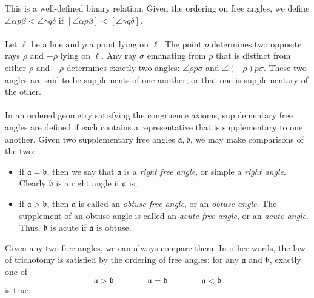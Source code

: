 \documentclass[12pt]{article}
\begin{document}
This is a well-defined binary relation.  Given the ordering on free
angles, we define $\angle \alpha p\beta<\angle \gamma q\delta$ if
$[\angle \alpha p\beta]<[\angle \gamma q\delta]$.
\\\\
Let $\ell$ be a line and $p$ a point lying on $\ell$.  The point $p$
determines two opposite rays $\rho$ and $-\rho$ lying on $\ell$. Any
ray $\sigma$ emanating from $p$ that is distinct from either $\rho$
and $-\rho$ determines exactly two angles: $\angle \rho p\sigma$ and
$\angle (-\rho)p\sigma$.  These two angles are said to be
supplements of one another, or that one is supplementary of the
other.
\\\\
In an ordered geometry satisfying the congruence axioms,
supplementary free angles are defined if each contains a
representative that is supplementary to one another.  Given two
supplementary free angles $\mathfrak{a},\mathfrak{b}$, we may make
comparisons of the two:
\begin{itemize}
\item if $\mathfrak{a}=\mathfrak{b}$, then we say that $\mathfrak{a}$ is a
\emph{right free angle}, or simple a \emph{right angle}.  Clearly
$\mathfrak{b}$ is a right angle if $\mathfrak{a}$ is;
\item if $\mathfrak{a}>\mathfrak{b}$, then $\mathfrak{a}$ is called
an \emph{obtuse free angle}, or an \emph{obtuse angle}.  The
supplement of an obtuse angle is called an \emph{acute free angle},
or an \emph{acute angle}.  Thus, $\mathfrak{b}$ is acute if
$\mathfrak{a}$ is obtuse.
\end{itemize}
Given any two free angles, we can always compare them.  In other
words, the law of trichotomy is satisfied by the ordering of free
angles: for any $\mathfrak{a}$ and $\mathfrak{b}$, exactly one of
$$\mathfrak{a}>\mathfrak{b}\qquad\qquad\mathfrak{a}=\mathfrak{b}
\qquad\qquad\mathfrak{a}<\mathfrak{b}$$ is true.
\end{document}
